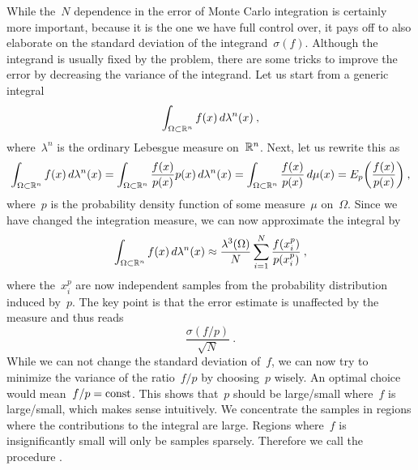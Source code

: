 While the~$N$ dependence in the error of Monte Carlo integration is certainly
more important, because it is the one we have full control over, it pays off to
also elaborate on the standard deviation of the integrand~$\sigma(f)$. Although
the integrand is usually fixed by the problem, there are some tricks to improve
the error by decreasing the variance of the integrand. Let us start from a
generic integral
%
\begin{equation}
  \int_{\Omega \subset \mathbb{R}^n} f(x) \,d\lambda^n(x)\:,
\end{equation}
%
where~$\lambda^n$ is the ordinary Lebesgue measure on~$\mathbb{R}^n$. Next, let us
rewrite this as
%
\begin{equation}
  \int_{\Omega \subset \mathbb{R}^n} f(x) \,d\lambda^n(x) =
    \int_{\Omega \subset \mathbb{R}^n} \frac{f(x)}{p(x)} p(x) \,d\lambda^n(x) =
    \int_{\Omega \subset \mathbb{R}^n} \frac{f(x)}{p(x)} \,d\mu(x) =
    E_{p}\biggl(\frac{f(x)}{p(x)}\biggr) \:,
\end{equation}
%
where~$p$ is the probability density function of some measure~$\mu$ on~$\Omega$.
Since we have changed the integration measure, we can now approximate the
integral by
%
\begin{equation}
  \int_{\Omega \subset \mathbb{R}^n} f(x) \,d\lambda^n(x) \approx
  \frac{\lambda^3(\Omega)}{N} \sum_{i=1}^N \frac{f(x_i^p)}{p(x_i^p)}\:,
\end{equation}
%
where the~$x_i^p$ are now independent samples from the probability distribution
induced by~$p$. The key point is that the error estimate is unaffected by the
measure and thus reads
%
\begin{equation}
  \frac{\sigma(f/p)}{\sqrt{N}} \:.
\end{equation}
%
While we can not change the standard deviation of~$f$, we can now try to
minimize the variance of the ratio~$f/p$ by choosing~$p$ wisely. An optimal
choice would mean~$f/p = \mathrm{const}$. This shows that~$p$ should be large/small
where~$f$ is large/small, which makes sense intuitively. We concentrate the
samples in regions where the contributions to the integral are large. Regions
where~$f$ is insignificantly small will only be samples sparsely. Therefore we
call the procedure .

